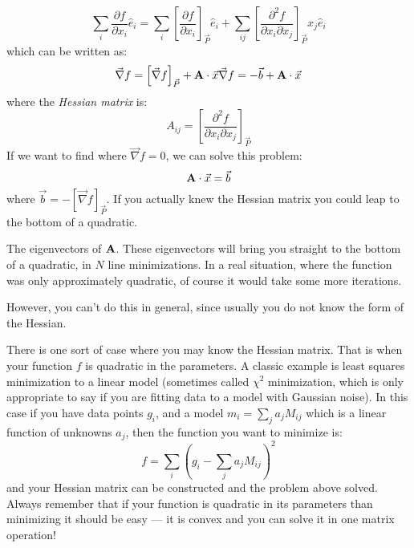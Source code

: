 \begin{answer}
\begin{equation}
\sum_i \frac{\partial f}{\partial x_i} {\hat e}_i = \sum_i
\left[\frac{\partial f}{\partial x_i}\right]_{\vec{P}} {\hat e}_i +
\sum_{ij} \left[\frac{\partial^2 f}{\partial x_i \partial
    x_j}\right]_{\vec{P}} x_j {\hat e}_i
\end{equation}
which can be written as:
\begin{equation}
\vec{\nabla}f = \left[\vec{\nabla}f \right]_{\vec{P}} + 
{\bf A}\cdot{\vec{x}}
\vec{\nabla}f = - \vec{b} +
{\bf A}\cdot{\vec{x}}
\end{equation}
where the {\it Hessian matrix} is:
\begin{equation}
A_{ij} = 
\left[\frac{\partial^2 f}{\partial x_i \partial x_j}\right]_{\vec{P}}
\end{equation}
If we want to find where $\vec{\nabla}f=0$, we can solve this problem:
\begin{equation}
{\bf A}\cdot\vec{x} = \vec{b}
\end{equation}
where $\vec{b} = - \left[\vec{\nabla} f \right]_{\vec{P}}$. 
If you actually knew the Hessian matrix you could leap to the bottom
of a quadratic.
\end{answer}


\begin{answer}
The eigenvectors of ${\bf A}$. These eigenvectors will bring you
straight to the bottom of a quadratic, in $N$ line minimizations. In a
real situation, where the function was only approximately quadratic,
of course it would take some more iterations.

However, you can't do this in general, since usually you do not know
the form of the Hessian.
\end{answer}

There is one sort of case where you may know the Hessian matrix. That
is when your function $f$ is quadratic in the parameters. A classic
example is least squares minimization to a linear model (sometimes
called $\chi^2$ minimization, which is only appropriate to say if you
are fitting data to a model with Gaussian noise). In this case if you
have data points $g_i$, and a model $m_i = \sum_j a_j M_{ij}$ which is
a linear function of unknowns $a_j$, then the function you want to
minimize is:
\begin{equation}
f = \sum_i \left( g_i - \sum_{j} a_j M_{ij} \right)^2
\end{equation}
and your Hessian matrix can be constructed and the problem above
solved. Always remember that if your function is quadratic in its
parameters than minimizing it should be easy --- it is convex and you
can solve it in one matrix operation!

